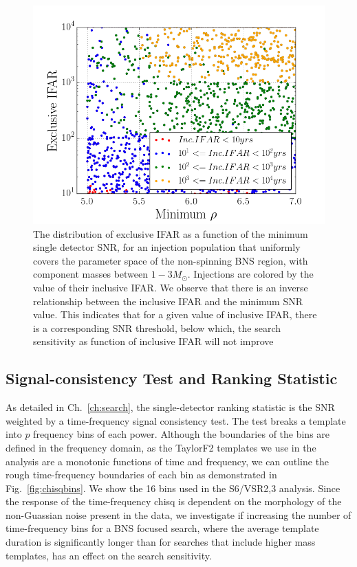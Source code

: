 \begin{figure}
\centering
\includegraphics[width=1.0\textwidth]{papers/bns_o1_dev/figures/ifarifar.png}
\caption{\label{fig:ifarifar} 
The distribution of exclusive IFAR as a function of the minimum single detector SNR, for an injection population that uniformly covers the parameter space of the non-spinning BNS region, with component masses between $1- 3M_\odot$. Injections are colored by the value of their inclusive IFAR. We observe that there is an inverse relationship between the inclusive IFAR and the minimum SNR value. This indicates that for a given value of inclusive IFAR, there is a corresponding SNR threshold, below which, the search sensitivity as function of inclusive IFAR will not improve
}
\end{figure}


\subsection{Signal-consistency Test and Ranking Statistic}
\label{sec:chisq}

As detailed in Ch.~\ref{ch:search}, the single-detector ranking statistic is the SNR weighted by a time-frequency signal consistency test. The test breaks a template into $p$  frequency bins of each power. Although the boundaries of the bins are defined in the frequency domain, as the TaylorF2 templates we use in the analysis are a monotonic functions of time and frequency, we can outline the rough time-frequency boundaries of each bin as demonstrated in Fig.~\ref{fig:chisqbins}. We show the 16 bins used in the S6/VSR2,3 analysis. Since the response of the time-frequency chisq is dependent on the morphology of the non-Guassian noise present in the data, we investigate if increasing the number of time-frequency bins for a BNS focused search, where the average template duration is significantly longer than for searches that include higher mass templates, has an effect on the search sensitivity.

